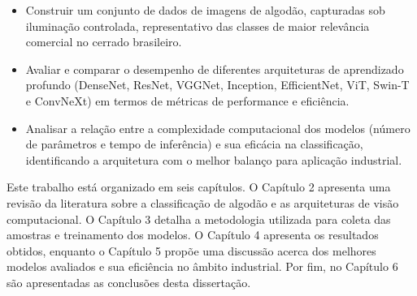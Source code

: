\begin{itemize}
    \item Construir um conjunto de dados de imagens de algodão, capturadas sob iluminação controlada, representativo das classes de maior relevância comercial no cerrado brasileiro.
    
    \item Avaliar e comparar o desempenho de diferentes arquiteturas de aprendizado profundo (DenseNet, ResNet, VGGNet, Inception, EfficientNet, ViT, Swin-T e ConvNeXt) em termos de métricas de performance e eficiência.
    
    \item Analisar a relação entre a complexidade computacional dos modelos (número de parâmetros e tempo de inferência) e sua eficácia na classificação, identificando a arquitetura com o melhor balanço para aplicação industrial.
\end{itemize}

Este trabalho está organizado em seis capítulos. O Capítulo 2 apresenta uma revisão da literatura sobre a classificação de algodão e as arquiteturas de visão computacional. O Capítulo 3 detalha a metodologia utilizada para coleta das amostras e treinamento dos modelos. O Capítulo 4 apresenta os resultados obtidos, enquanto o Capítulo 5 propõe uma discussão acerca dos melhores modelos avaliados e sua eficiência no âmbito industrial. Por fim, no Capítulo 6 são apresentadas as conclusões desta dissertação.